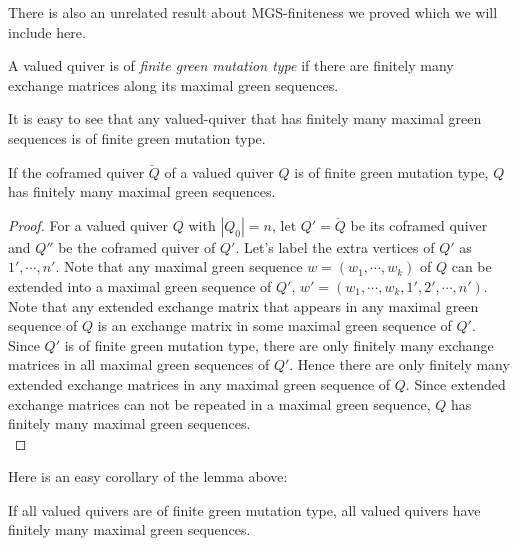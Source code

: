 \indent There is also an unrelated result about MGS-finiteness we proved which we will include here.
\begin{definition}
A valued quiver is of \textit{finite green mutation type} if there are finitely many exchange matrices along its maximal green sequences.
\end{definition}
It is easy to see that any valued-quiver that has finitely many maximal green sequences is of finite green mutation type.\\
\begin{lemma}
If the coframed quiver $\breve{Q}$ of a valued quiver $Q$ is of finite green mutation type, $Q$ has finitely many maximal green sequences.\\
\end{lemma}
\begin{proof}
For a valued quiver $Q$ with $|Q_0|=n$, let $Q'=\breve{Q}$ be its coframed quiver and $Q''$ be the coframed quiver of $Q'$. Let's label the extra vertices of $Q'$ as $1',\cdots, n'$. Note that any maximal green sequence $w=(w_1,\cdots, w_k)$ of $Q$ can be extended into a maximal green sequence of $Q'$, $w'=(w_1,\cdots, w_k, 1', 2',\cdots, n')$. Note that any extended exchange matrix that appears in any maximal green sequence of $Q$ is an exchange matrix in some maximal green sequence of $Q'$. Since $Q'$ is of finite green mutation type, there are only finitely many exchange matrices in all maximal green sequences of $Q'$. Hence there are only finitely many extended exchange matrices in any maximal green sequence of $Q$. Since extended exchange matrices can not be repeated in a maximal green sequence, $Q$ has finitely many maximal green sequences.\\ 
\end{proof}
\indent Here is an easy corollary of the lemma above:\\
\begin{corollary}
If all valued quivers are of finite green mutation type, all valued quivers have finitely many maximal green sequences.\\
\end{corollary}
